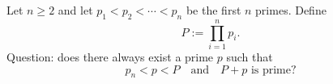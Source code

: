 Let $n\ge 2$ and let $p_1<p_2<\cdots<p_n$ be the first $n$ primes. Define
\[
P:=\prod_{i=1}^n p_i.
\]
Question: does there always exist a prime $p$ such that
\[
p_n < p < P\quad\text{and}\quad P+p\text{ is prime}?
\]
